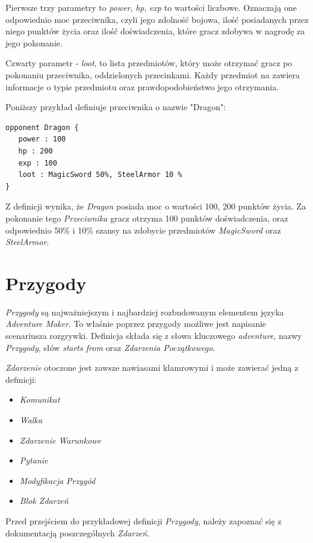 \documentclass[openright]{xmgr}
\begin{document}
Pierwsze trzy parametry to \textit{power}, \textit{hp}, \textit{exp} to wartości liczbowe. Oznaczają one odpowiednio moc przeciwnika, czyli jego zdolność bojowa, ilość posiadanych przez niego punktów życia oraz ilość doświadczenia, które gracz zdobywa w nagrodę za jego pokonanie.

Czwarty parametr - \textit{loot}, to lista przedmiotów, który może otrzymać gracz po pokonaniu przeciwnika, oddzielonych przecinkami. Każdy przedmiot na zawiera informacje o typie przedmiotu oraz prawdopodobieństwo jego otrzymania.

Poniższy przykład definiuje przeciwnika o nazwie "Dragon":

\begin{verbatim}
opponent Dragon {
   power : 100
   hp : 200
   exp : 100
   loot : MagicSword 50%, SteelArmor 10 %
}
\end{verbatim}

Z definicji wynika, że \textit{Dragon} posiada moc o wartości 100, 200 punktów życia. Za pokonanie tego \textit{Przeciwnika} gracz otrzyma 100 punktów doświadczenia, oraz odpowiednio 50\% i 10\% szansy na zdobycie przedmiotów \textit{MagicSword} oraz \textit{SteelArmor}.

\section{Przygody}
\textit{Przygody} są najważniejszym i najbardziej rozbudowanym elementem języka \textit{Adventure Maker}. To właśnie poprzez przygody możliwe jest napisanie scenariusza rozgrywki. Definicja składa się z słowa kluczowego \textit{adventure}, nazwy \textit{Przygody}, słów \textit{starts from} oraz \textit{Zdarzenia Początkowego}.

\textit{Zdarzenie} otoczone jest zawsze nawiasami klamrowymi i może zawierać jedną z definicji:
\begin{itemize}
	\item \textit{Komunikat}
	\item \textit{Walka}
	\item \textit{Zdarzenie Warunkowe}
	\item \textit{Pytanie}
	\item \textit{Modyfikacja Przygód}
	\item \textit{Blok Zdarzeń}
\end{itemize}

Przed przejściem do przykładowej definicji \textit{Przygody}, należy zapoznać się z dokumentacją poszczególnych \textit{Zdarzeń}.
\end{document}
